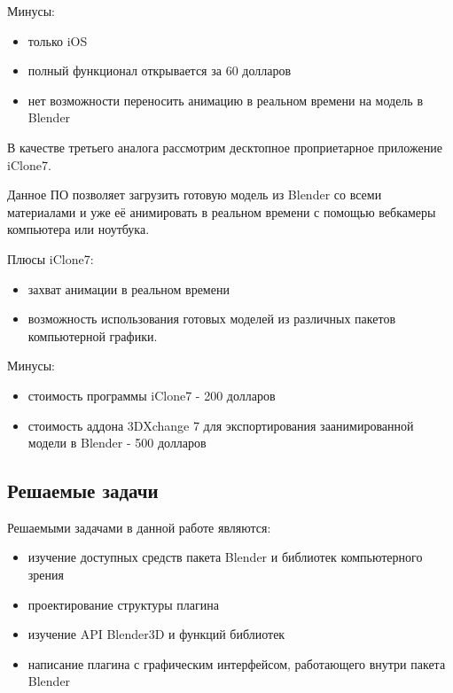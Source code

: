 Минусы:
\begin{itemize}
	\item только iOS
	\item полный функционал открывается за 60 долларов
	\item нет возможности переносить анимацию в реальном времени на модель в Blender
\end{itemize}

В качестве третьего аналога рассмотрим десктопное проприетарное приложение iClone7.

Данное ПО позволяет загрузить готовую модель из Blender со всеми материалами и уже её анимировать в реальном времени с помощью вебкамеры компьютера или ноутбука.

Плюсы iClone7:
\begin{itemize}
	\item захват анимации в реальном времени
	\item возможность использования готовых моделей из различных пакетов компьютерной графики.
\end{itemize}
Минусы:
\begin{itemize}
	\item стоимость программы iClone7 - 200 долларов
	\item стоимость аддона 3DXchange 7 для экспортирования заанимированной модели в Blender - 500 долларов
\end{itemize}


\subsection{Решаемые задачи}


Решаемыми задачами в данной работе являются:
\begin{itemize}
	\item изучение доступных средств пакета Blender и библиотек компьютерного зрения
	\item проектирование структуры плагина
	\item изучение API Blender3D и функций библиотек 
	\item написание плагина с графическим интерфейсом, работающего внутри пакета Blender
\end{itemize}


\clearpage
